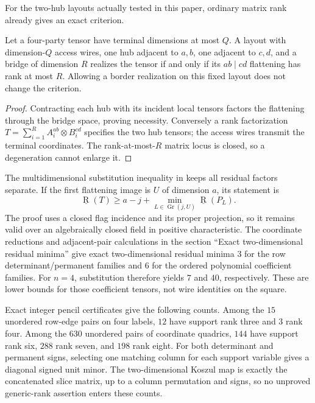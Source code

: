 For the two-hub layouts actually tested in this paper, ordinary matrix rank already gives an exact criterion.
\begin{lemma}\label{lem:twohub-rank}
Let a four-party tensor have terminal dimensions at most $Q$. A layout with dimension-$Q$ access wires, one hub adjacent to $a,b$, one adjacent to $c,d$, and a bridge of dimension $R$ realizes the tensor if and only if its $ab\mid cd$ flattening has rank at most $R$. Allowing a border realization on this fixed layout does not change the criterion.
\end{lemma}
\begin{proof}
Contracting each hub with its incident local tensors factors the flattening through the bridge space, proving necessity. Conversely a rank factorization
$T=\sum_{i=1}^R A_i^{ab}\otimes B_i^{cd}$
specifies the two hub tensors; the access wires transmit the terminal coordinates. The rank-at-most-$R$ matrix locus is closed, so a degeneration cannot enlarge it.
\end{proof}

The multidimensional substitution inequality in \cite[section ``The all-field multidimensional substitution statement'']{SuppliedPencils2026} keeps all residual factors separate. If the first flattening image is $U$ of dimension $a$, its statement is
\[
 \underline{\operatorname R}(T)\geq
 a-j+\min_{L\in\operatorname{Gr}(j,U)}
       \underline{\operatorname R}(P_L).
\]
The proof uses a closed flag incidence and its proper projection, so it remains valid over an algebraically closed field in positive characteristic. The coordinate reductions and adjacent-pair calculations in the section ``Exact two-dimensional residual minima'' give exact two-dimensional residual minima $3$ for the row determinant/permanent families and $6$ for the ordered polynomial coefficient families. For $n=4$, substitution therefore yields $7$ and $40$, respectively. These are lower bounds for those coefficient tensors, not wire identities on the square.

Exact integer pencil certificates give the following counts. Among the $15$ unordered row-edge pairs on four labels, $12$ have support rank three and $3$ rank four. Among the $630$ unordered pairs of coordinate quadrics, $144$ have support rank six, $288$ rank seven, and $198$ rank eight. For both determinant and permanent signs, selecting one matching column for each support variable gives a diagonal signed unit minor. The two-dimensional Koszul map is exactly the concatenated slice matrix, up to a column permutation and signs, so no unproved generic-rank assertion enters these counts.

